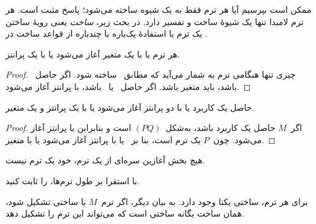 \documentclass[../../../include/open-logic-section]{subfiles}
\begin{document}

ممکن است بپرسیم آیا هر ترم فقط به یک شیوه ساخته می‌شود؛ پاسخ مثبت است.
هر ترم لامبدا تنها یک شیوهٔ ساخت و تفسیر دارد. در بحث زیر، \emph{ساخت}
یعنی رویهٔ ساختن یک ترم با استفادهٔ یک‌باره یا چندباره از قواعد ساخت در
.

\begin{lem}
هر ترم یا با یک متغیر آغاز می‌شود یا با یک پرانتز.
\end{lem}

\begin{proof}
چیزی تنها هنگامی ترم به شمار می‌آید که مطابق~
ساخته شود. اگر حاصل~ باشد، باید متغیر باشد. اگر
حاصل~ یا~ باشد، با
پرانتز آغاز می‌شود.
\end{proof}

\begin{lem}
حاصل یک کاربرد یا با دو پرانتز آغاز می‌شود یا با یک پرانتز و یک متغیر.
\end{lem}

\begin{proof}
اگر~$M$ حاصل یک کاربرد باشد، به‌شکل~$(PQ)$ است و بنابراین با پرانتز آغاز
می‌شود. چون~$P$ یک ترم است، بنا بر~ یا با پرانتز
آغاز می‌شود یا با متغیر.
\end{proof}

\begin{lem}
هیچ بخش آغازین سره‌ای از یک ترم، خود یک ترم نیست.
\end{lem}

\begin{prob}
با استقرا بر طول ترم‌ها،  را ثابت کنید.
\end{prob}

\begin{prop} 
برای هر ترم، ساختی یکتا وجود دارد. به بیان دیگر، اگر ترم~$M$ با ساختی
تشکیل شود، همان ساخت یگانه ساختی است که می‌تواند این ترم را تشکیل دهد.
\end{prop}
\end{document}

